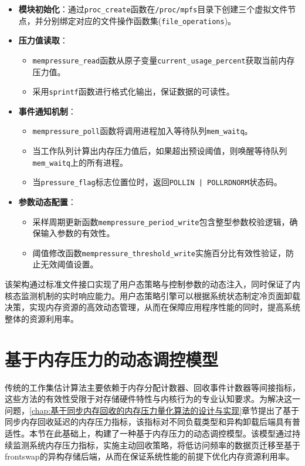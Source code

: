 \begin{itemize}
    \item \textbf{模块初始化}：通过\texttt{proc\_create}函数在\texttt{/proc/mpfs}目录下创建三个虚拟文件节点，并分别绑定对应的文件操作函数集(\texttt{file\_operations})。
    \item \textbf{压力值读取}：
    \begin{itemize}
        \item \texttt{mempressure\_read}函数从原子变量\texttt{current\_usage\_percent}获取当前内存压力值。
        \item 采用\texttt{sprintf}函数进行格式化输出，保证数据的可读性。
    \end{itemize}
    \item \textbf{事件通知机制}：
    \begin{itemize}
        \item \texttt{mempressure\_poll}函数将调用进程加入等待队列\texttt{mem\_waitq}。
        \item 当工作队列计算出内存压力值后，如果超出预设阈值，则唤醒等待队列\texttt{mem\_waitq}上的所有进程。
        \item 当\texttt{pressure\_flag}标志位置位时，返回\texttt{POLLIN | POLLRDNORM}状态码。
    \end{itemize}
    \item \textbf{参数动态配置}：
    \begin{itemize}
        \item 采样周期更新函数\texttt{mempressure\_period\_write}包含整型参数校验逻辑，确保输入参数的有效性。
        \item 阈值修改函数\texttt{mempressure\_threshold\_write}实施百分比有效性验证，防止无效阈值设置。
    \end{itemize}
\end{itemize}

该架构通过标准文件接口实现了用户态策略与控制参数的动态注入，同时保证了内核态监测机制的实时响应能力。用户态策略引擎可以根据系统状态制定冷页面卸载决策，实现内存资源的高效动态管理，从而在保障应用程序性能的同时，提高系统整体的资源利用率。




\section{基于内存压力的动态调控模型}
\label{sec:pressure_based_model}

传统的工作集估计算法主要依赖于内存分配计数器、回收事件计数器等间接指标，这些方法的有效性受限于对存储硬件特性与内核行为的专业认知要求。为解决这一问题，\ref{chap:基于同步内存回收的内存压力量化算法的设计与实现}章节提出了基于同步内存回收延迟的内存压力指标，该指标对不同负载类型和异构卸载后端具有普适性。本节在此基础上，构建了一种基于内存压力的动态调控模型。该模型通过持续监测系统内存压力指标，实施主动回收策略，将低访问频率的数据页迁移至基于frontswap的异构存储后端，从而在保证系统性能的前提下优化内存资源利用率。


